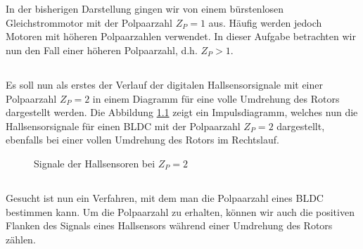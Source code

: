 \chapter{}\label{ch:auf3}
In der bisherigen Darstellung gingen wir von einem bürstenlosen Gleichstrommotor mit der Polpaarzahl $ Z_{P} = 1 $ aus. Häufig werden jedoch Motoren mit höheren Polpaarzahlen verwendet. In dieser Aufgabe betrachten wir nun den Fall einer höheren Polpaarzahl, d.h. $ Z_{P} > 1$.

\section{}\label{sec:3a}
Es soll nun als erstes der Verlauf der digitalen Hallsensorsignale mit einer Polpaarzahl $ Z_{P} = 2 $ in einem Diagramm für eine volle Umdrehung des Rotors dargestellt werden.
Die Abbildung \ref{fig:3a:hall} zeigt ein Impulsdiagramm, welches nun die Hallsensorsignale für einen BLDC mit der Polpaarzahl $ Z_{P} = 2 $ dargestellt, ebenfalls bei einer vollen Umdrehung des Rotors im Rechtslauf.
\begin{figure}[h]
	\centering
	
	\caption{Signale der Hallsensoren bei $ Z_{P} = 2 $}
	\label{fig:3a:hall}
\end{figure}

\section{}\label{sec:3b}
Gesucht ist nun ein Verfahren, mit dem man die Polpaarzahl eines BLDC bestimmen kann. Um die Polpaarzahl zu erhalten, können wir auch die positiven Flanken des Signals eines Hallsensors während einer Umdrehung des Rotors zählen.

